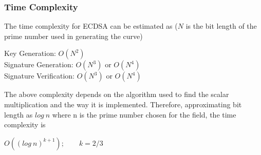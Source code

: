\subsubsection{Time Complexity}
\par
\noindent The time complexity for ECDSA can be estimated as ($N$ is the bit length of the prime number used in generating the curve)
\begin{center}
    Key Generation: $O(N^2)$ \\
    Signature Generation: $O(N^3)$ or $O(N^4)$\\
    Signature Verification: $O(N^3)$ or $O(N^4)$
\end{center}
\noindent The above complexity depends on the algorithm used to find the scalar multiplication and the way it is implemented. Therefore, approximating bit length as $log \: n$ where n is the prime number chosen for the field, the time complexity is
\begin{center}
    $O((log\:n)^{k+1}); \qquad k = 2/3$
\end{center}
